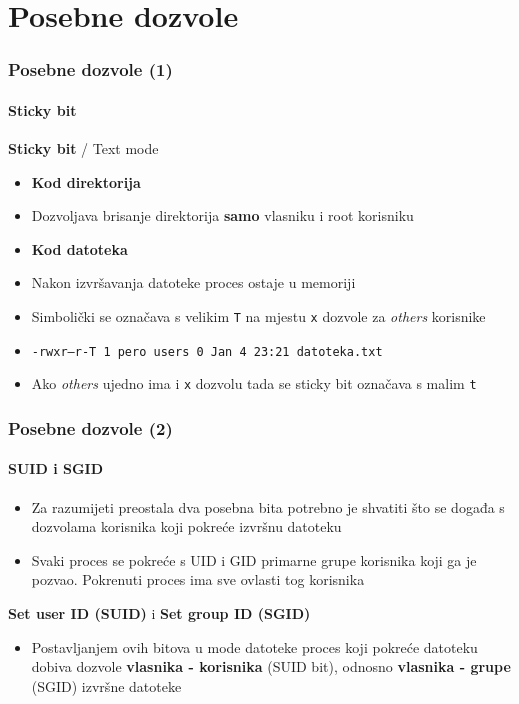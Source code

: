 \documentclass[table,usenames,dvipsnames] {beamer}
\newcommand{\shell}[1]{\texttt{#1}}
\begin{document}
\section{Posebne dozvole}
\begin{frame}[t]
  \frametitle{Posebne dozvole (1)}
  \framesubtitle{Sticky bit}
\textbf{Sticky bit} / Text mode
\begin{itemize}
  \item \textbf{Kod direktorija}
  \item[] Dozvoljava brisanje direktorija \textbf{samo} vlasniku i root korisniku
  \item \textbf{Kod datoteka}
  \item[] Nakon izvršavanja datoteke proces ostaje u memoriji
\end{itemize}
\begin{itemize}
  \item Simbolički se označava s velikim \shell{T} na mjestu \shell{x} dozvole za \textit{others} korisnike
  \item[] {\footnotesize \shell{-rwxr--r-T 1 pero users 0 Jan  4 23:21 datoteka.txt} }
  \item Ako \textit{others} ujedno ima i \shell{x} dozvolu tada se sticky bit označava s malim \shell{t}
\end{itemize}
\end{frame}

\begin{frame}[t]
  \frametitle{Posebne dozvole (2)}
  \framesubtitle{SUID i SGID}
\begin{itemize}
  \item Za razumijeti preostala dva posebna bita potrebno je shvatiti što se događa s dozvolama korisnika koji pokreće izvršnu datoteku
  \item Svaki proces se pokreće s UID i GID primarne grupe korisnika koji ga je pozvao. Pokrenuti proces ima sve ovlasti tog korisnika
\end{itemize}
\vfill
\textbf{Set user ID (SUID)} i \textbf{Set group ID (SGID)}
\begin{itemize}
  \item Postavljanjem ovih bitova u mode datoteke proces koji pokreće datoteku dobiva dozvole \textbf{vlasnika - korisnika} (SUID bit), odnosno \textbf{vlasnika - grupe} (SGID) izvršne datoteke
\end{itemize}
\end{frame}
\end{document}
